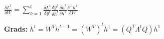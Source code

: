$\frac{\delta L^t}{\delta W} = \sum_{k=1}^t \frac{\delta L^t}{\delta y^t} \frac{\delta y^t}{\delta h^t} \frac{\delta h^t}{\delta h^k} \frac{\delta^+ h^k}{\delta W}$\\

\textbf{Grads:} $h^t = W^T h^{t-1} = (W^T)^t h^1 = (Q^T \Lambda^t Q) h^1$\\

